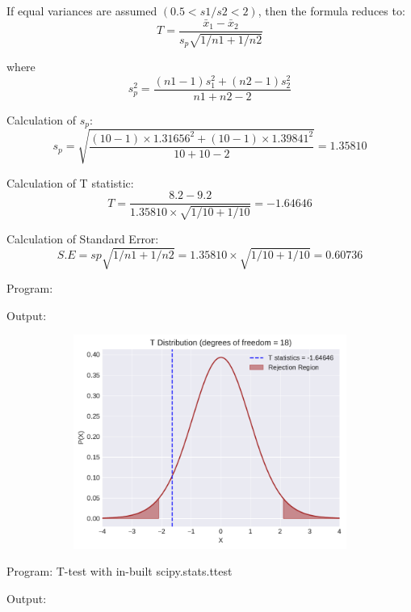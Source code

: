 \documentclass[a4paper,10pt,openright]{report}
\begin{document}
\begin{enumerate}
If equal variances are assumed $(0.5 < s1/s2 < 2)$, then the formula reduces to:
\begin{equation*}
T = \frac{\bar x_{1} - \bar x_{2}}{s_{p} \sqrt{1/n1 + 1/n2}}
\end{equation*}

where
\begin{equation*}
s_{p}^{2} = \frac{(n1-1)s_{1}^{2} + (n2-1)s_{2}^{2}}{n1+n2-2}
\end{equation*}

Calculation of $s_{p}$:
\begin{equation*}
s_{p} = \sqrt{\frac{(10-1) \times 1.31656^{2} + (10-1) \times 1.39841^{2}}{10+10-2}} 
      = 1.35810
\end{equation*}

Calculation of T statistic:
\begin{equation*}
T = \frac{8.2 - 9.2}{1.35810 \times \sqrt{1/10 + 1/10}} = -1.64646
\end{equation*}

Calculation of Standard Error:
\begin{equation*}
S.E = sp \sqrt{1/n1 + 1/n2} = 1.35810 \times \sqrt{1/10 + 1/10} = 0.60736
\end{equation*}

\vspace{3cm}

Program:

Output:


\begin{figure}[ht!]
\includegraphics[width=14cm,height=7cm,keepaspectratio]{tscript3.pdf}
\centering
\end{figure}

\pagebreak

Program: T-test with in-built scipy.stats.ttest

Output:



\end{enumerate}
\end{document}

